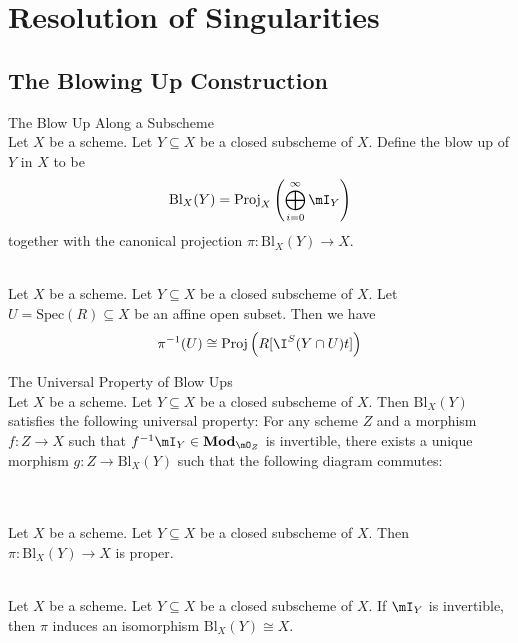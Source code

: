 \documentclass[a4paper]{article}
\begin{document}
\pagebreak
\section{Resolution of Singularities}
\subsection{The Blowing Up Construction}
\begin{defn}{The Blow Up Along a Subscheme}{}\\
Let $X$ be a scheme. Let $Y\subseteq X$ be a closed subscheme of $X$. Define the blow up of $Y$ in $X$ to be $$\text{Bl}_X(Y)=\text{Proj}_X\left(\bigoplus_{i=0}^\infty\mI_Y\right)$$ together with the canonical projection $\pi:\text{Bl}_X(Y)\to X$. 
\end{defn}

\begin{prp}{}{}\\
Let $X$ be a scheme. Let $Y\subseteq X$ be a closed subscheme of $X$. Let $U=\text{Spec}(R)\subseteq X$ be an affine open subset. Then we have $$\pi^{-1}(U)\cong\text{Proj}\left(R[\I^S(Y\cap U)t]\right)$$
\end{prp}

\begin{prp}{The Universal Property of Blow Ups}{}\\
Let $X$ be a scheme. Let $Y\subseteq X$ be a closed subscheme of $X$. Then $\text{Bl}_X(Y)$ satisfies the following universal property: For any scheme $Z$ and a morphism $f:Z\to X$ such that $f^{-1}\mI_Y\in\bold{Mod}_{\mO_Z}$ is invertible, there exists a unique morphism $g:Z\to\text{Bl}_X(Y)$ such that the following diagram commutes: \\
 \\
\end{prp}

\begin{prp}{}{}\\
Let $X$ be a scheme. Let $Y\subseteq X$ be a closed subscheme of $X$. Then $\pi:\text{Bl}_X(Y)\to X$ is proper. 
\end{prp}

\begin{lmm}{}{}\\
Let $X$ be a scheme. Let $Y\subseteq X$ be a closed subscheme of $X$. If $\mI_Y$ is invertible, then $\pi$ induces an isomorphism $\text{Bl}_X(Y)\cong X$. 
\end{lmm}
\end{document}
